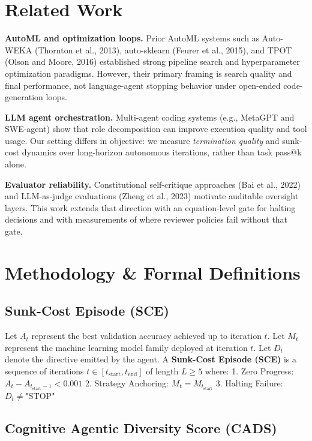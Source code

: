 \documentclass[11pt,a4paper]{article}
\begin{document}
\section{Related Work}

\textbf{AutoML and optimization loops.} Prior AutoML systems such as Auto-WEKA (Thornton et al., 2013), auto-sklearn (Feurer et al., 2015), and TPOT (Olson and Moore, 2016) established strong pipeline search and hyperparameter optimization paradigms. However, their primary framing is search quality and final performance, not language-agent stopping behavior under open-ended code-generation loops.

\textbf{LLM agent orchestration.} Multi-agent coding systems (e.g., MetaGPT and SWE-agent) show that role decomposition can improve execution quality and tool usage. Our setting differs in objective: we measure \textit{termination quality} and sunk-cost dynamics over long-horizon autonomous iterations, rather than task pass@k alone.

\textbf{Evaluator reliability.} Constitutional self-critique approaches (Bai et al., 2022) and LLM-as-judge evaluations (Zheng et al., 2023) motivate auditable oversight layers. This work extends that direction with an equation-level gate for halting decisions and with measurements of where reviewer policies fail without that gate.

\section{Methodology \& Formal Definitions}

\subsection{Sunk-Cost Episode (SCE)}

Let $A_t$ represent the best validation accuracy achieved up to iteration $t$. Let $M_t$ represent the machine learning model family deployed at iteration $t$. Let $D_t$ denote the directive emitted by the agent. A \textbf{Sunk-Cost Episode (SCE)} is a sequence of iterations $t \in [t_{\text{start}}, t_{\text{end}}]$ of length $L \ge 5$ where:
1. Zero Progress: $A_t - A_{t_{\text{start}}-1} < 0.001$
2. Strategy Anchoring: $M_t = M_{t_{\text{start}}}$
3. Halting Failure: $D_t \neq \text{"STOP"}$

\subsection{Cognitive Agentic Diversity Score (CADS)}
\end{document}
